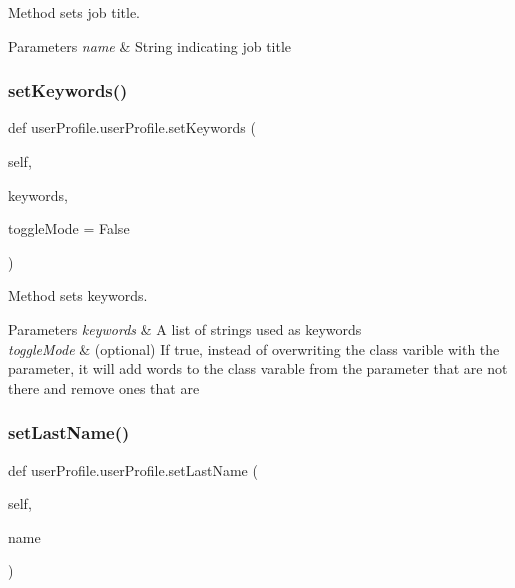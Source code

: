 Method sets job title. 


\begin{DoxyParams}{Parameters}
{\em name} & String indicating job title \\
\hline
\end{DoxyParams}
\mbox{\label{classuserProfile_1_1userProfile_ad1e2dc6aedf50cba360f2bc6669ea3f9}} 
\subsubsection{\texorpdfstring{set\+Keywords()}{setKeywords()}}
{\footnotesize\ttfamily def user\+Profile.\+user\+Profile.\+set\+Keywords (\begin{DoxyParamCaption}\item[{}]{self,  }\item[{}]{keywords,  }\item[{}]{toggle\+Mode = {\ttfamily False} }\end{DoxyParamCaption})}



Method sets keywords. 


\begin{DoxyParams}{Parameters}
{\em keywords} & A list of strings used as keywords \\
\hline
{\em toggle\+Mode} & (optional) If true, instead of overwriting the class varible with the parameter, it will add words to the class varable from the parameter that are not there and remove ones that are \\
\hline
\end{DoxyParams}
\mbox{\label{classuserProfile_1_1userProfile_ab6c77d7b146fbf8d9ffb79ae0d6a2c00}} 
\subsubsection{\texorpdfstring{set\+Last\+Name()}{setLastName()}}
{\footnotesize\ttfamily def user\+Profile.\+user\+Profile.\+set\+Last\+Name (\begin{DoxyParamCaption}\item[{}]{self,  }\item[{}]{name }\end{DoxyParamCaption})}



